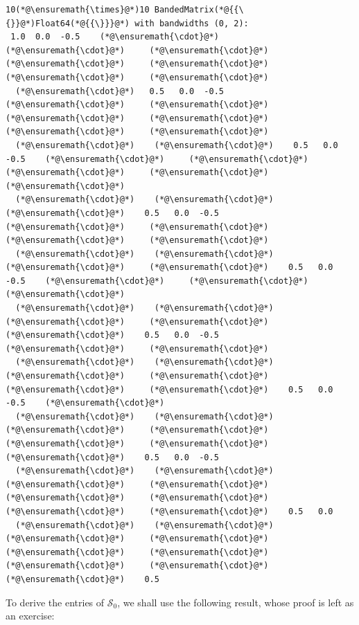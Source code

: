 \documentclass[12pt,a4paper]{article}
\begin{document}
\begin{lstlisting}
10(*@\ensuremath{\times}@*)10 BandedMatrix(*@{{\{}}@*)Float64(*@{{\}}}@*) with bandwidths (0, 2):
 1.0  0.0  -0.5    (*@\ensuremath{\cdot}@*)     (*@\ensuremath{\cdot}@*)     (*@\ensuremath{\cdot}@*)     (*@\ensuremath{\cdot}@*)     (*@\ensuremath{\cdot}@*)     (*@\ensuremath{\cdot}@*)     (*@\ensuremath{\cdot}@*) 
  (*@\ensuremath{\cdot}@*)   0.5   0.0  -0.5    (*@\ensuremath{\cdot}@*)     (*@\ensuremath{\cdot}@*)     (*@\ensuremath{\cdot}@*)     (*@\ensuremath{\cdot}@*)     (*@\ensuremath{\cdot}@*)     (*@\ensuremath{\cdot}@*) 
  (*@\ensuremath{\cdot}@*)    (*@\ensuremath{\cdot}@*)    0.5   0.0  -0.5    (*@\ensuremath{\cdot}@*)     (*@\ensuremath{\cdot}@*)     (*@\ensuremath{\cdot}@*)     (*@\ensuremath{\cdot}@*)     (*@\ensuremath{\cdot}@*) 
  (*@\ensuremath{\cdot}@*)    (*@\ensuremath{\cdot}@*)     (*@\ensuremath{\cdot}@*)    0.5   0.0  -0.5    (*@\ensuremath{\cdot}@*)     (*@\ensuremath{\cdot}@*)     (*@\ensuremath{\cdot}@*)     (*@\ensuremath{\cdot}@*) 
  (*@\ensuremath{\cdot}@*)    (*@\ensuremath{\cdot}@*)     (*@\ensuremath{\cdot}@*)     (*@\ensuremath{\cdot}@*)    0.5   0.0  -0.5    (*@\ensuremath{\cdot}@*)     (*@\ensuremath{\cdot}@*)     (*@\ensuremath{\cdot}@*) 
  (*@\ensuremath{\cdot}@*)    (*@\ensuremath{\cdot}@*)     (*@\ensuremath{\cdot}@*)     (*@\ensuremath{\cdot}@*)     (*@\ensuremath{\cdot}@*)    0.5   0.0  -0.5    (*@\ensuremath{\cdot}@*)     (*@\ensuremath{\cdot}@*) 
  (*@\ensuremath{\cdot}@*)    (*@\ensuremath{\cdot}@*)     (*@\ensuremath{\cdot}@*)     (*@\ensuremath{\cdot}@*)     (*@\ensuremath{\cdot}@*)     (*@\ensuremath{\cdot}@*)    0.5   0.0  -0.5    (*@\ensuremath{\cdot}@*) 
  (*@\ensuremath{\cdot}@*)    (*@\ensuremath{\cdot}@*)     (*@\ensuremath{\cdot}@*)     (*@\ensuremath{\cdot}@*)     (*@\ensuremath{\cdot}@*)     (*@\ensuremath{\cdot}@*)     (*@\ensuremath{\cdot}@*)    0.5   0.0  -0.5
  (*@\ensuremath{\cdot}@*)    (*@\ensuremath{\cdot}@*)     (*@\ensuremath{\cdot}@*)     (*@\ensuremath{\cdot}@*)     (*@\ensuremath{\cdot}@*)     (*@\ensuremath{\cdot}@*)     (*@\ensuremath{\cdot}@*)     (*@\ensuremath{\cdot}@*)    0.5   0.0
  (*@\ensuremath{\cdot}@*)    (*@\ensuremath{\cdot}@*)     (*@\ensuremath{\cdot}@*)     (*@\ensuremath{\cdot}@*)     (*@\ensuremath{\cdot}@*)     (*@\ensuremath{\cdot}@*)     (*@\ensuremath{\cdot}@*)     (*@\ensuremath{\cdot}@*)     (*@\ensuremath{\cdot}@*)    0.5
\end{lstlisting}


To derive the entries of $\mathcal{S}_0$, we shall use the following result, whose proof is left as an exercise:
\end{document}
